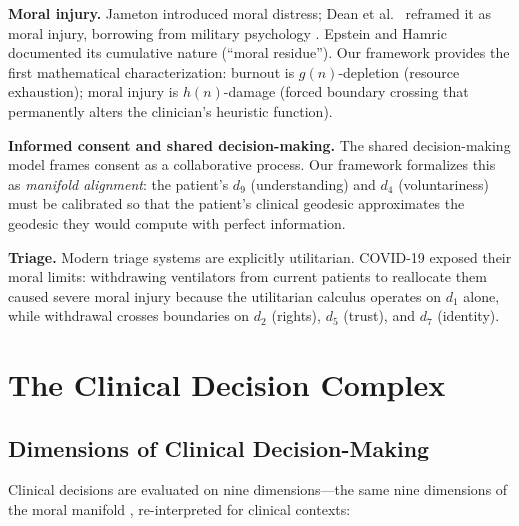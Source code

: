 \documentclass[12pt]{article}
\theoremstyle{definition}
\theoremstyle{remark}
\begin{document}
\textbf{Moral injury.}  Jameton \cite{jameton1984} introduced moral distress; Dean et al.\ \cite{dean2019} reframed it as moral injury, borrowing from military psychology \cite{litz2009}.  Epstein and Hamric \cite{epstein2009} documented its cumulative nature (``moral residue'').  Our framework provides the first mathematical characterization: burnout is $g(n)$-depletion (resource exhaustion); moral injury is $h(n)$-damage (forced boundary crossing that permanently alters the clinician's heuristic function).

\textbf{Informed consent and shared decision-making.}  The shared decision-making model \cite{charles1997,elwyn2012} frames consent as a collaborative process.  Our framework formalizes this as \emph{manifold alignment}: the patient's $d_9$ (understanding) and $d_4$ (voluntariness) must be calibrated so that the patient's clinical geodesic approximates the geodesic they would compute with perfect information.

\textbf{Triage.}  Modern triage systems \cite{gilboy2011,emanuel2020} are explicitly utilitarian.  COVID-19 exposed their moral limits: withdrawing ventilators from current patients to reallocate them caused severe moral injury \cite{greenberg2020} because the utilitarian calculus operates on $d_1$ alone, while withdrawal crosses boundaries on $d_2$ (rights), $d_5$ (trust), and $d_7$ (identity).


\section{The Clinical Decision Complex}
\label{sec:manifold}

\subsection{Dimensions of Clinical Decision-Making}

Clinical decisions are evaluated on nine dimensions---the same nine dimensions of the moral manifold \cite{bond2026geometric}, re-interpreted for clinical contexts:
\end{document}
